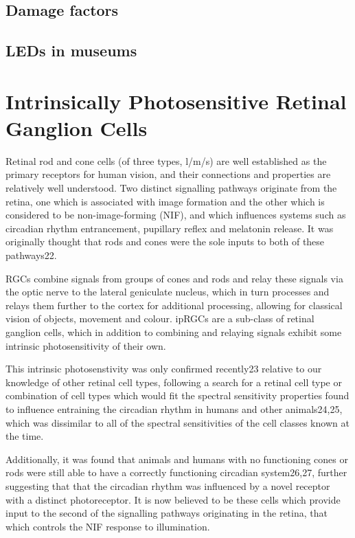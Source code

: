 \subsection{Damage factors}
\subsection{LEDs in museums}


\section{Intrinsically Photosensitive Retinal Ganglion Cells}
Retinal rod and cone cells (of three types, l/m/s) are well established as the primary receptors for human vision, and their connections and properties are relatively well understood. Two distinct signalling pathways originate from the retina, one which is associated with image formation and the other which is considered to be non-image-forming (NIF), and which influences systems such as circadian rhythm entrancement, pupillary reflex and melatonin release. It was originally thought that rods and cones were the sole inputs to both of these pathways22.

\Glspl{RGC} combine signals from groups of cones and rods and relay these signals via the optic nerve to the lateral geniculate nucleus, which in turn processes and relays them further to the cortex for additional processing, allowing for classical vision of objects, movement and colour. \Glspl{ipRGC} are a sub-class of retinal ganglion cells, which in addition to combining and relaying signals exhibit some intrinsic photosensitivity of their own. 

This intrinsic photosenstivity was only confirmed recently23 relative to our knowledge of other retinal cell types, following a search for a retinal cell type or combination of cell types which would fit the spectral sensitivity properties found to influence entraining the circadian rhythm in humans and other animals24,25, which was dissimilar to all of the spectral sensitivities of the cell classes known at the time.

Additionally, it was found that animals and humans with no functioning cones or rods were still able to have a correctly functioning circadian system26,27, further suggesting that that the circadian rhythm was influenced by a novel receptor with a distinct photoreceptor. It is now believed to be these cells which provide input to the second of the signalling pathways originating in the retina, that which controls the NIF response to illumination.

